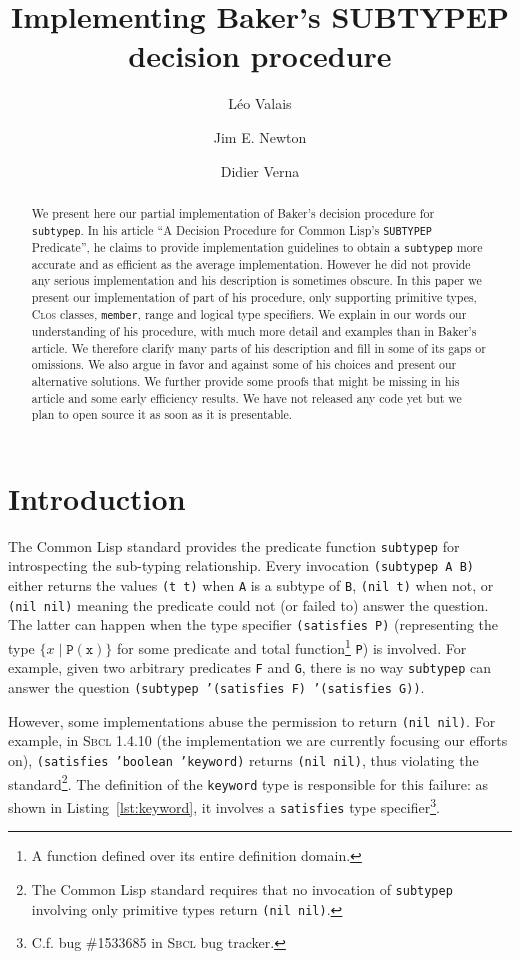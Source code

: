 \documentclass[format=sigconf]{acmart}
\title{Implementing Baker's SUBTYPEP decision procedure}
\author{Léo Valais}
\author{Jim E. Newton}
\author{Didier Verna}
\affiliation{%
  \institution{EPITA/LRDE}
  \streetaddress{14-16 rue Voltaire}
  \postcode{94270}
  \city{Le Kremlin-Bic{\^e}tre}
  \country{France}
}
\newcommand\code[2][\small]{\sloppy\texttt{#1#2}}
\newcommand\footcode[1]{\code[\scriptsize]{#1}}
\theoremstyle{definition}
\newcommand\sbcl{\textsc{Sbcl}}
\begin{document}
\begin{abstract}
  We present here our partial implementation of Baker's decision procedure for
  \code{subtypep}. In his article ``A Decision Procedure for Common Lisp's
  \code{SUBTYPEP} Predicate'', he claims to provide implementation guidelines to
  obtain a \code{subtypep} more accurate and as efficient as the average
  implementation. However he did not provide any serious implementation and his
  description is sometimes obscure. In this paper we present our implementation
  of part of his procedure, only supporting primitive types, \textsc{Clos}
  classes, \code{member}, range and logical type specifiers.
  We explain in our words our understanding of his procedure, with much more
  detail and examples than in Baker's article. We therefore clarify many parts
  of his description and fill in some of its gaps or omissions.
  We also argue in favor and against some of his choices and present our
  alternative solutions. We further provide some proofs that might
  be missing in his article and some early efficiency results. We have not
  released any code yet but we plan to open source it as soon as it is
  presentable.
\end{abstract}

\maketitle

\section{Introduction}
The Common Lisp standard \cite{bib:ansi.94.cl} provides the predicate function
\code{subtypep} for
introspecting the sub-typing relationship. Every invocation \code{(subtypep A B)}
either returns the values \code{(t t)} when \code{A} is a subtype of \code{B},
\code{(nil t)} when not, or \code{(nil nil)} meaning the predicate could not
(or failed to) answer the question. The latter can happen when the type
specifier \code{(satisfies P)} (representing the type $\{x \mid
\mathtt{P(x)}\}$ for some predicate and total function\footnote{A function
  defined over its entire definition domain.} \code{P}) is involved. For example,
given two arbitrary predicates \code{F} and \code{G}, there is no way
\code{subtypep} can answer the question \code{(subtypep '(satisfies F)
  '(satisfies G))}.

However, some implementations abuse the permission to return \code{(nil nil)}.
For example, in \sbcl{} 1.4.10 (the implementation we are currently focusing our
efforts on), {\small\code{(satisfies 'boolean 'keyword)}} returns
\code{(nil nil)}, thus violating the standard\footnote{The Common Lisp standard
  requires that no invocation of \footcode{subtypep} involving only primitive types
  return \footcode{(nil nil)}.}. The definition of the \code{keyword} type is
responsible for this failure: as shown in Listing~\ref{lst:keyword}, it
involves a \code{satisfies} type specifier\footnote{%
  C.f. bug \#1533685 in \sbcl{} bug tracker.
}.
\end{document}
